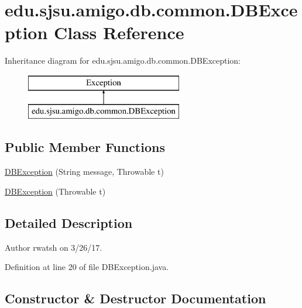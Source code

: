 \hypertarget{classedu_1_1sjsu_1_1amigo_1_1db_1_1common_1_1_d_b_exception}{}\section{edu.\+sjsu.\+amigo.\+db.\+common.\+D\+B\+Exception Class Reference}
\label{classedu_1_1sjsu_1_1amigo_1_1db_1_1common_1_1_d_b_exception}
Inheritance diagram for edu.\+sjsu.\+amigo.\+db.\+common.\+D\+B\+Exception\+:\begin{figure}[H]
\begin{center}
\leavevmode
\includegraphics[height=2.000000cm]{classedu_1_1sjsu_1_1amigo_1_1db_1_1common_1_1_d_b_exception}
\end{center}
\end{figure}
\subsection*{Public Member Functions}
\begin{DoxyCompactItemize}
\item 
\hyperlink{classedu_1_1sjsu_1_1amigo_1_1db_1_1common_1_1_d_b_exception_aeb84a0c52571e2d7940aa5465f05aed6}{D\+B\+Exception} (String message, Throwable t)
\item 
\hyperlink{classedu_1_1sjsu_1_1amigo_1_1db_1_1common_1_1_d_b_exception_a878f8f4e07c6a42bfb6dc8bae41bf2b4}{D\+B\+Exception} (Throwable t)
\end{DoxyCompactItemize}


\subsection{Detailed Description}
\begin{DoxyAuthor}{Author}
rwatsh on 3/26/17. 
\end{DoxyAuthor}


Definition at line 20 of file D\+B\+Exception.\+java.



\subsection{Constructor \& Destructor Documentation}
\mbox{\label{classedu_1_1sjsu_1_1amigo_1_1db_1_1common_1_1_d_b_exception_aeb84a0c52571e2d7940aa5465f05aed6}} 

